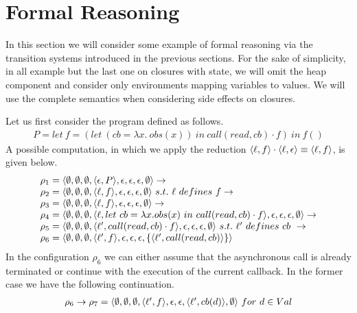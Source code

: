 \section{Formal Reasoning}
\label{sec:fr}
%
In this section we will consider some example of formal reasoning via the transition systems introduced in the previous sections.
For the sake of simplicity, in all example but the last one on closures with state, we will
omit the heap component and consider only environments mapping variables to values.
We will use the complete semantics when considering side effects on closures.

Let us first consider the program defined as follows.
$$
\begin{array}{l}
P=let \ f=(let\ (cb=\lambda x.\ obs(x))\ in\ call(read,cb)\cdot f)\ in\ f()
\end{array}
$$
A possible computation, in which we apply the reduction 
$\langle \ell,f \rangle\cdot\langle \ell,\epsilon \rangle\equiv \langle \ell,f \rangle$, is given below.
$$
\begin{array}{l}
\rho_1=\langle \emptyset,\emptyset,\emptyset,\langle \epsilon,P \rangle,\epsilon,\epsilon,\epsilon,\emptyset \rangle
\rightarrow\\
\rho_2=\langle \emptyset,\emptyset,\emptyset,\langle \ell,f \rangle,\epsilon,\epsilon,\epsilon,\emptyset \rangle
\ s.t.\ \ell\ defines\ f
\rightarrow\\
\rho_3=\langle \emptyset,\emptyset,\emptyset,\langle \ell,f \rangle,\epsilon,\epsilon,\epsilon,\emptyset \rangle
\rightarrow\\
\rho_4=\langle \emptyset,\emptyset,\emptyset,\langle \ell,let\ cb=\lambda x.obs(x)\ in\ call(read,cb)\cdot f \rangle,\epsilon,\epsilon,\epsilon,\emptyset \rangle
\rightarrow\\
\rho_5=\langle \emptyset,\emptyset,\emptyset,\langle \ell',call(read,cb)\cdot f \rangle,
       \epsilon,\epsilon,\epsilon,
			 \emptyset \rangle\ s.t.\ \ell'\ defines\ cb\ \rightarrow\\
\rho_6=\langle \emptyset,\emptyset,\emptyset,\langle \ell',f \rangle,
  \epsilon,\epsilon,\epsilon,
	\{\langle \ell',call(read,cb) \rangle\} \rangle
\end{array}
$$
In the configuration $\rho_6$ we can either assume that the asynchronous call is already terminated or
continue with the execution of the current callback.
In the former case we have the following continuation.
$$
\begin{array}{l}
\rho_6 \rightarrow\rho_7=\langle \emptyset,\emptyset,\emptyset,\langle \ell',f \rangle,
              \epsilon,\epsilon,
							\langle \ell',cb(d) \rangle,\emptyset \rangle\ for\ d\in Val
\end{array}
$$
